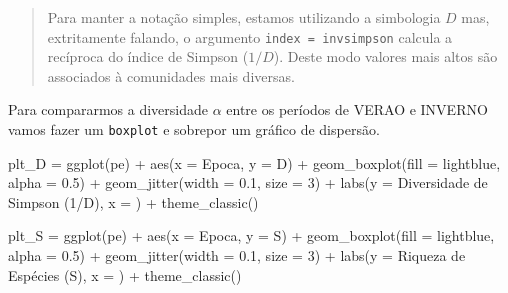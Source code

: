 \documentclass[
]{book}
\newenvironment{Shaded}{\begin{snugshade}}{\end{snugshade}}
\newcommand{\AttributeTok}[1]{\textcolor[rgb]{0.77,0.63,0.00}{#1}}
\newcommand{\DecValTok}[1]{\textcolor[rgb]{0.00,0.00,0.81}{#1}}
\newcommand{\FloatTok}[1]{\textcolor[rgb]{0.00,0.00,0.81}{#1}}
\newcommand{\FunctionTok}[1]{\textcolor[rgb]{0.00,0.00,0.00}{#1}}
\newcommand{\NormalTok}[1]{#1}
\newcommand{\OtherTok}[1]{\textcolor[rgb]{0.56,0.35,0.01}{#1}}
\newcommand{\SpecialCharTok}[1]{\textcolor[rgb]{0.00,0.00,0.00}{#1}}
\newcommand{\StringTok}[1]{\textcolor[rgb]{0.31,0.60,0.02}{#1}}
\begin{document}
\begin{quote}
Para manter a notação simples, estamos utilizando a simbologia \(D\) mas, extritamente falando, o argumento \texttt{index\ =\ \textquotesingle{}invsimpson\textquotesingle{}} calcula a recíproca do índice de Simpson (\(1/D\)). Deste modo valores mais altos são associados à comunidades mais diversas.
\end{quote}

Para compararmos a diversidade \(\alpha\) entre os períodos de VERAO e INVERNO vamos fazer um \texttt{boxplot} e sobrepor um gráfico de dispersão.

\begin{Shaded}
\begin{Highlighting}[]
\NormalTok{plt\_D }\OtherTok{=} \FunctionTok{ggplot}\NormalTok{(pe) }\SpecialCharTok{+}
  \FunctionTok{aes}\NormalTok{(}\AttributeTok{x =}\NormalTok{ Epoca, }\AttributeTok{y =}\NormalTok{ D) }\SpecialCharTok{+}
  \FunctionTok{geom\_boxplot}\NormalTok{(}\AttributeTok{fill =} \StringTok{\textquotesingle{}lightblue\textquotesingle{}}\NormalTok{, }\AttributeTok{alpha =} \FloatTok{0.5}\NormalTok{) }\SpecialCharTok{+}
  \FunctionTok{geom\_jitter}\NormalTok{(}\AttributeTok{width =} \FloatTok{0.1}\NormalTok{, }\AttributeTok{size =} \DecValTok{3}\NormalTok{) }\SpecialCharTok{+}
  \FunctionTok{labs}\NormalTok{(}\AttributeTok{y =} \StringTok{\textquotesingle{}Diversidade de Simpson (1/D)\textquotesingle{}}\NormalTok{, }
        \AttributeTok{x =} \StringTok{\textquotesingle{}\textquotesingle{}}\NormalTok{) }\SpecialCharTok{+}
  \FunctionTok{theme\_classic}\NormalTok{()}

\NormalTok{plt\_S }\OtherTok{=} \FunctionTok{ggplot}\NormalTok{(pe) }\SpecialCharTok{+}
  \FunctionTok{aes}\NormalTok{(}\AttributeTok{x =}\NormalTok{ Epoca, }\AttributeTok{y =}\NormalTok{ S) }\SpecialCharTok{+}
  \FunctionTok{geom\_boxplot}\NormalTok{(}\AttributeTok{fill =} \StringTok{\textquotesingle{}lightblue\textquotesingle{}}\NormalTok{, }\AttributeTok{alpha =} \FloatTok{0.5}\NormalTok{) }\SpecialCharTok{+}
  \FunctionTok{geom\_jitter}\NormalTok{(}\AttributeTok{width =} \FloatTok{0.1}\NormalTok{, }\AttributeTok{size =} \DecValTok{3}\NormalTok{) }\SpecialCharTok{+}
  \FunctionTok{labs}\NormalTok{(}\AttributeTok{y =} \StringTok{\textquotesingle{}Riqueza de Espécies (S)\textquotesingle{}}\NormalTok{, }
        \AttributeTok{x =} \StringTok{\textquotesingle{}\textquotesingle{}}\NormalTok{) }\SpecialCharTok{+}
  \FunctionTok{theme\_classic}\NormalTok{()}


\end{Highlighting}
\end{Shaded}
\end{document}
